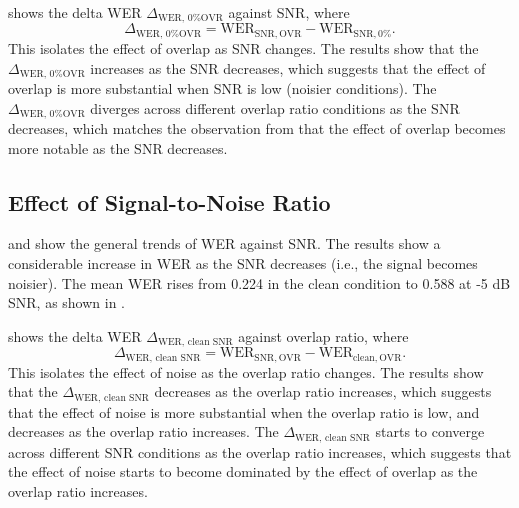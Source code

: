  shows the delta WER $\Delta_\text{WER, 0\% OVR}$ against SNR, where
\begin{equation}
    \Delta_\text{WER, 0\% OVR} = \text{WER}_{\mathrm{SNR}, \mathrm{OVR}} - \text{WER}_{\mathrm{SNR}, 0\%}.
\end{equation}
This isolates the effect of overlap as SNR changes. The results show that the $\Delta_\text{WER, 0\% OVR}$ increases as the SNR decreases, which suggests that the effect of overlap is more substantial when SNR is low (noisier conditions). The $\Delta_\text{WER, 0\% OVR}$ diverges across different overlap ratio conditions as the SNR decreases, which matches the observation from  that the effect of overlap becomes more notable as the SNR decreases.

\subsection{Effect of Signal-to-Noise Ratio}
 and  show the general trends of WER against SNR. The results show a considerable increase in WER as the SNR decreases (i.e., the signal becomes noisier). The mean WER rises from 0.224 in the clean condition to 0.588 at -5 dB SNR, as shown in .

 shows the delta WER $\Delta_\text{WER, clean SNR}$ against overlap ratio, where
\begin{equation}
    \Delta_\text{WER, clean SNR} = \text{WER}_{\mathrm{SNR}, \mathrm{OVR}} - \text{WER}_{\mathrm{clean}, \mathrm{OVR}}.
\end{equation}
This isolates the effect of noise as the overlap ratio changes. The results show that the $\Delta_\text{WER, clean SNR}$ decreases as the overlap ratio increases, which suggests that the effect of noise is more substantial when the overlap ratio is low, and decreases as the overlap ratio increases. The $\Delta_\text{WER, clean SNR}$ starts to converge across different SNR conditions as the overlap ratio increases, which suggests that the effect of noise starts to become dominated by the effect of overlap as the overlap ratio increases.

